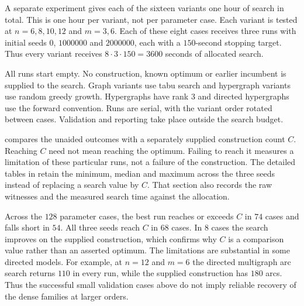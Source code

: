 A separate experiment gives each of the sixteen variants one hour of search
in total. This is one hour per variant, not per parameter case. Each variant
is tested at $n=6,8,10,12$ and $m=3,6$. Each of these eight cases receives
three runs with initial seeds $0$, $1000000$ and $2000000$, each with a
$150$-second stopping target. Thus every variant receives
$8\cdot3\cdot150=3600$ seconds of allocated search.

All runs start empty. No construction, known optimum or earlier incumbent is
supplied to the search. Graph variants use tabu search and hypergraph variants
use random greedy growth. Hypergraphs have rank $3$ and directed hypergraphs
use the forward convention. Runs are serial, with the variant order rotated
between cases. Validation and reporting take place outside the search budget.

 compares the unaided outcomes with a separately
supplied construction count $C$. Reaching $C$ need not mean reaching the
optimum. Failing to reach it measures a limitation of these particular runs,
not a failure of the construction. The detailed tables in
 retain the minimum, median and maximum across
the three seeds instead of replacing a search value by $C$. That section also
records the raw witnesses and the measured search time against the
allocation.

\begin{table}[htbp]
\centering
\scriptsize

\caption{Eight parameter cases per variant under a one-hour total search
allocation. The first count records cases where the best of three seeds
reaches or exceeds the supplied construction count $C$. The second requires
all three seeds to do so. Neither column counts proved optima.}
\label{tab:equal-budget-summary}
\end{table}

\begin{samepage}
Across the $128$ parameter cases, the best run reaches or exceeds $C$ in $74$
cases and falls short in $54$. All three seeds reach $C$ in $68$ cases. In
$8$ cases the search improves on the supplied construction, which confirms
why $C$ is a comparison value rather than an asserted optimum.
The limitations are substantial in some directed models. For example, at
$n=12$ and $m=6$ the directed multigraph arc search returns $110$ in every
run, while the supplied construction has $180$ arcs. Thus the successful
small validation cases above do not imply reliable recovery of the dense
families at larger orders.\par
\end{samepage}
